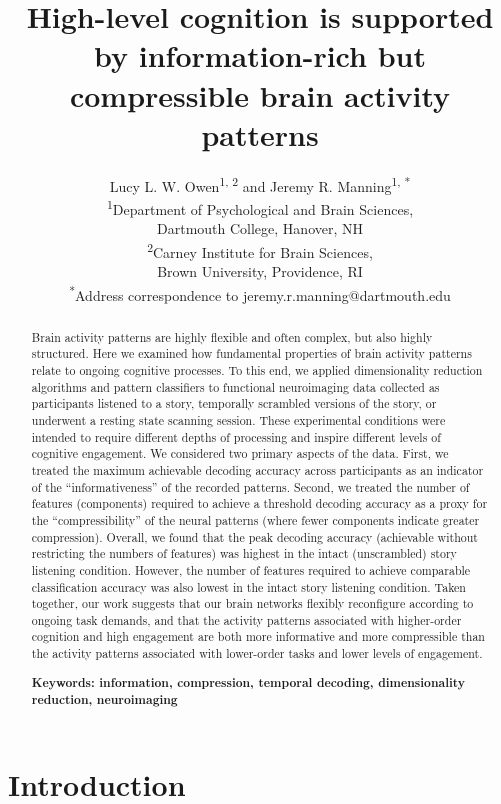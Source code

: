 \documentclass[english, 11pt]{article}
\title{High-level cognition is supported by information-rich but compressible brain activity patterns}
\author{Lucy L. W. Owen\textsuperscript{1, 2} and Jeremy R. Manning\textsuperscript{1,
*}\\\textsuperscript{1}Department of Psychological and Brain Sciences,\\Dartmouth College,
Hanover, NH\\[0.1cm]\textsuperscript{2}Carney Institute for Brain Sciences,\\Brown University,
Providence, RI\\[0.1cm] \textsuperscript{*}Address correspondence to
jeremy.r.manning@dartmouth.edu}
\begin{document}
\maketitle


\begin{abstract} 
  
Brain activity patterns are highly flexible and often complex, but also highly
structured. Here we examined how fundamental properties of brain activity
patterns relate to ongoing cognitive processes. To this end, we applied
dimensionality reduction algorithms and pattern classifiers to functional
neuroimaging data collected as participants listened to a story, temporally
scrambled versions of the story, or underwent a resting state scanning session.
These experimental conditions were intended to require different depths of
processing and inspire different levels of cognitive engagement. We considered
two primary aspects of the data. First, we treated the maximum achievable
decoding accuracy across participants as an indicator of the
``informativeness'' of the recorded patterns. Second, we treated the number of
features (components) required to achieve a threshold decoding accuracy as a
proxy for the ``compressibility'' of the neural patterns (where fewer
components indicate greater compression). Overall, we found that the peak
decoding accuracy (achievable without restricting the numbers of features) was
highest in the intact (unscrambled) story listening condition. However, the
number of features required to achieve comparable classification accuracy was
also lowest in the intact story listening condition. Taken together, our work
suggests that our brain networks flexibly reconfigure according to ongoing task
demands, and that the activity patterns associated with higher-order cognition
and high engagement are both more informative and more compressible than the
activity patterns associated with lower-order tasks and lower levels of
engagement.

\bigskip
\noindent
\textbf{Keywords: information, compression, temporal decoding, dimensionality
reduction, neuroimaging}

\end{abstract}

\doublespacing

\section*{Introduction}
\end{document}
